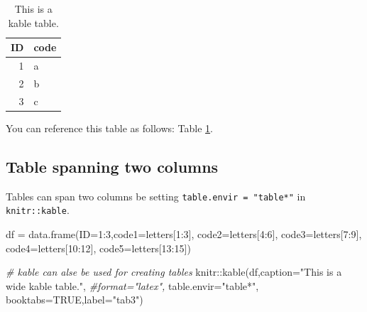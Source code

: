 \documentclass[webpdf,large,contemporary,namedate]{oup-authoring-template}
\newenvironment{Shaded}{\begin{snugshade}}{\end{snugshade}}
\newcommand{\AttributeTok}[1]{\textcolor[rgb]{0.77,0.63,0.00}{#1}}
\newcommand{\CommentTok}[1]{\textcolor[rgb]{0.56,0.35,0.01}{\textit{#1}}}
\newcommand{\ConstantTok}[1]{\textcolor[rgb]{0.00,0.00,0.00}{#1}}
\newcommand{\DecValTok}[1]{\textcolor[rgb]{0.00,0.00,0.81}{#1}}
\newcommand{\FunctionTok}[1]{\textcolor[rgb]{0.00,0.00,0.00}{#1}}
\newcommand{\NormalTok}[1]{#1}
\newcommand{\OtherTok}[1]{\textcolor[rgb]{0.56,0.35,0.01}{#1}}
\newcommand{\SpecialCharTok}[1]{\textcolor[rgb]{0.00,0.00,0.00}{#1}}
\newcommand{\StringTok}[1]{\textcolor[rgb]{0.31,0.60,0.02}{#1}}
\theoremstyle{thmstyleone}
\theoremstyle{thmstyletwo}
\theoremstyle{thmstylethree}
\begin{document}
\begin{table}

\caption{\label{tab:tab2}This is a kable table.}
\centering
\begin{tabular}[t]{rl}
\toprule
ID & code\\
\midrule
1 & a\\
2 & b\\
3 & c\\
\bottomrule
\end{tabular}
\end{table}

You can reference this table as follows: Table \ref{tab:tab2}.

\hypertarget{table-spanning-two-columns}{%
\subsection{Table spanning two
columns}\label{table-spanning-two-columns}}

Tables can span two columns be setting \texttt{table.envir\ =\ "table*"}
in \texttt{knitr::kable}.

\begin{Shaded}
\begin{Highlighting}[]
\NormalTok{df }\OtherTok{=} \FunctionTok{data.frame}\NormalTok{(}\AttributeTok{ID=}\DecValTok{1}\SpecialCharTok{:}\DecValTok{3}\NormalTok{,}\AttributeTok{code1=}\NormalTok{letters[}\DecValTok{1}\SpecialCharTok{:}\DecValTok{3}\NormalTok{],}
                \AttributeTok{code2=}\NormalTok{letters[}\DecValTok{4}\SpecialCharTok{:}\DecValTok{6}\NormalTok{],}
                \AttributeTok{code3=}\NormalTok{letters[}\DecValTok{7}\SpecialCharTok{:}\DecValTok{9}\NormalTok{],}
                \AttributeTok{code4=}\NormalTok{letters[}\DecValTok{10}\SpecialCharTok{:}\DecValTok{12}\NormalTok{],}
                \AttributeTok{code5=}\NormalTok{letters[}\DecValTok{13}\SpecialCharTok{:}\DecValTok{15}\NormalTok{])}

\CommentTok{\# kable can alse be used for creating tables}
\NormalTok{knitr}\SpecialCharTok{::}\FunctionTok{kable}\NormalTok{(df,}\AttributeTok{caption=}\StringTok{"This is a wide kable table."}\NormalTok{,}
             \CommentTok{\#format="latex",}
             \AttributeTok{table.envir=}\StringTok{"table*"}\NormalTok{,}
             \AttributeTok{booktabs=}\ConstantTok{TRUE}\NormalTok{,}\AttributeTok{label=}\StringTok{"tab3"}\NormalTok{)}
\end{Highlighting}
\end{Shaded}
\end{document}
